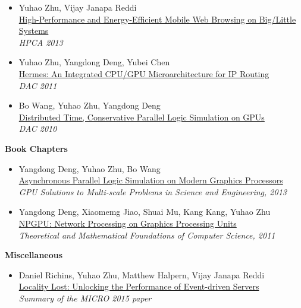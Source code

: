 \documentclass[margin, 9pt]{res} %
\begin{document}
\begin{resume}
\begin{itemize}[leftmargin=*]
	\item Yuhao Zhu, Vijay Janapa Reddi\\[2pt]
          \href{http://yuhaozhu.com/pubs/hpca13.pdf}{High-Performance and Energy-Efficient Mobile Web Browsing on Big/Little Systems}\\
          \textit{HPCA 2013}

	\item Yuhao Zhu, Yangdong Deng, Yubei Chen\\[2pt]
          \href{http://yuhaozhu.com/pubs/dac11.pdf}{Hermes: An Integrated CPU/GPU Microarchitecture for IP Routing}\\
          \textit{DAC 2011}

	\item Bo Wang, Yuhao Zhu, Yangdong Deng\\[2pt]
          \href{http://yuhaozhu.com/pubs/dac10.pdf}{Distributed Time, Conservative Parallel Logic Simulation on GPUs}\\
          \textit{DAC 2010}
\end{itemize}
 
\vspace*{7pt}
{\large\textbf{Book Chapters}}

\begin{itemize}[leftmargin=*] \itemsep 0pt
	\item Yangdong Deng, Yuhao Zhu, Bo Wang\\
          \href{http://link.springer.com/chapter/10.1007/978-3-642-16405-7_32}{Asynchronous Parallel Logic Simulation on Modern Graphics Processors}\\
          \textit{GPU Solutions to Multi-scale Problems in Science and Engineering, 2013}

	\item Yangdong Deng, Xiaomemg Jiao, Shuai Mu, Kang Kang, Yuhao Zhu\\
          \href{http://link.springer.com/chapter/10.1007/978-3-642-24999-0_44}{NPGPU: Network Processing on Graphics Processing Units}\\
          \textit{Theoretical and Mathematical Foundations of Computer Science, 2011}
\end{itemize}
 
\vspace*{7pt}
{\large\textbf{Miscellaneous}}

\begin{itemize}[leftmargin=*] \itemsep 0pt
	\item Daniel Richins, Yuhao Zhu, Matthew Halpern, Vijay Janapa Reddi\\
          \href{http://yuhaozhu.com/pubs/micro15-summary.pdf}{Locality Lost: Unlocking the Performance of Event-driven Servers}\\
          \textit{Summary of the MICRO 2015 paper}


\end{itemize}
\end{resume}
\end{document}

